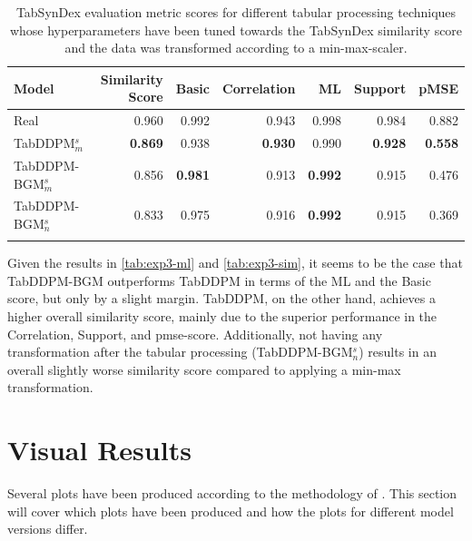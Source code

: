 \begin{table}[h]
	\centering
	\begin{tabular}{lrrrrrr}
		\toprule
		\textbf{Model}        & \textbf{Similarity Score} & \textbf{Basic} & \textbf{Correlation} & \textbf{ML}    & \textbf{Support} & \textbf{pMSE}  \\
		\midrule
		Real                  & 0.960                     & 0.992          & 0.943                & 0.998          & 0.984            & 0.882          \\
		TabDDPM$^{s}_{m}$     & \textbf{0.869}            & 0.938          & \textbf{0.930}       & 0.990          & \textbf{0.928}   & \textbf{0.558} \\
		TabDDPM-BGM$^{s}_{m}$ & 0.856                     & \textbf{0.981} & 0.913                & \textbf{0.992} & 0.915            & 0.476          \\
		TabDDPM-BGM$^{s}_{n}$ & 0.833                     & 0.975          & 0.916                & \textbf{0.992} & 0.915            & 0.369          \\
		\bottomrule
		\multicolumn{7}{c}{}\\[-0.6em]
	\end{tabular}
	\caption[Experiment 3 TabSynDex]{TabSynDex evaluation metric scores for different tabular processing techniques whose hyperparameters have been tuned towards the TabSynDex similarity score
		and the data was transformed according to a min-max-scaler.}
	\label{tab:exp3-sim}
\end{table}

Given the results in \autoref{tab:exp3-ml} and \autoref{tab:exp3-sim}, it seems to be the case that TabDDPM-BGM outperforms TabDDPM in terms of the ML and the Basic score, but only by a slight margin.
TabDDPM, on the other hand, achieves a higher overall similarity score, mainly due to the superior performance in the Correlation, Support, and \gls{pmse}-score.
Additionally, not having any transformation after the tabular processing (TabDDPM-BGM$^{s}_{n}$) results in an overall slightly worse similarity score compared to applying a min-max transformation.


\section{Visual Results}
\label{ch:results-Visual}

Several plots have been produced according to the methodology of \cite{brenninkmeijer2019GenerationEvaluationTabular}.
This section will cover which plots have been produced and how the plots for different model versions differ.


